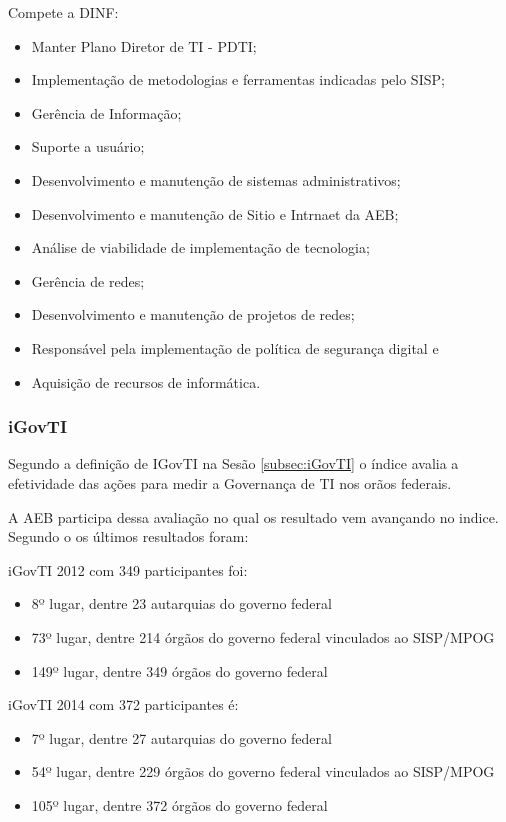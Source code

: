 Compete a DINF:

\begin{itemize}
\item Manter Plano Diretor de TI - PDTI;
\item Implementação de metodologias e ferramentas indicadas pelo SISP;
\item Gerência de Informação;
\item Suporte a usuário;
\item Desenvolvimento e manutenção de sistemas administrativos;
\item Desenvolvimento e manutenção de Sitio e Intrnaet da AEB;
\item Análise de viabilidade de implementação de tecnologia;
\item Gerência de redes;
\item Desenvolvimento e manutenção de projetos de redes;
\item Responsável pela implementação de política de segurança digital e 
\item Aquisição de recursos de informática.
\end{itemize}

\subsubsection{iGovTI}

Segundo a definição de IGovTI na Sesão \ref{subsec:iGovTI} o índice avalia a efetividade das ações para medir a Governança de TI nos orãos federais. 

A AEB participa dessa avaliação no qual os resultado vem avançando no indice.  Segundo o \cite{acordaoTCU} os últimos resultados foram:

iGovTI 2012 com 349 participantes foi:

\begin{itemize}
\item 8º lugar, dentre 23 autarquias do governo federal
\item 73º lugar, dentre 214 órgãos do governo federal vinculados ao SISP/MPOG
\item 149º lugar, dentre 349 órgãos do governo federal
\end{itemize}

iGovTI 2014 com 372 participantes é:

\begin{itemize}
\item 7º lugar, dentre 27 autarquias do governo federal
\item 54º lugar, dentre 229 órgãos do governo federal vinculados ao SISP/MPOG
\item 105º lugar, dentre 372 órgãos do governo federal
\end{itemize}

